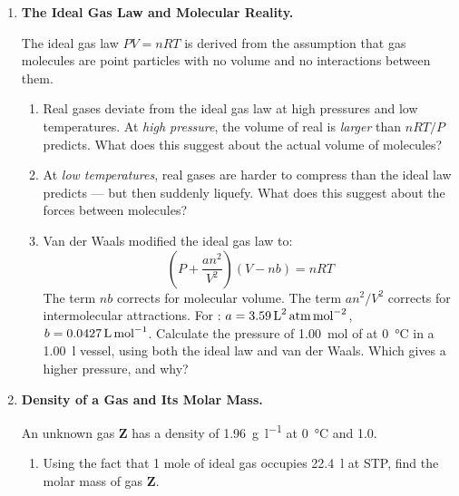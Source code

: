 \documentclass[12pt, a4paper]{book}
\theoremstyle{definition}
\begin{document}
\begin{deepbox}
\begin{enumerate}[label=\textbf{D\arabic*.}]
  \item \textbf{The Ideal Gas Law and Molecular Reality.}

        The ideal gas law $PV = nRT$ is derived from the assumption
        that gas molecules are point particles with no volume
        and no interactions between them.

        \begin{enumerate}[label=(\alph*)]
          \item Real gases deviate from the ideal gas law at
                high pressures and low temperatures.
                At \emph{high pressure}, the volume of real 
                is \emph{larger} than $nRT/P$ predicts.
                What does this suggest about the actual volume
                of  molecules?

          \item At \emph{low temperatures}, real gases are harder
                to compress than the ideal law predicts ---
                but then suddenly liquefy.
                What does this suggest about the forces between molecules?

          \item Van der Waals modified the ideal gas law to:
                \[
                  \left(P + \frac{an^2}{V^2}\right)(V - nb) = nRT
                \]
                The term $nb$ corrects for molecular volume.
                The term $an^2/V^2$ corrects for intermolecular
                attractions.
                For : $a = 3.59\,\text{L}^2\,\text{atm\,mol}^{-2}$,
                $b = 0.0427\,\text{L\,mol}^{-1}$.
                Calculate the pressure of \SI{1.00}{\mol} of 
                at \SI{0}{\degreeCelsius} in a \SI{1.00}{\litre} vessel,
                using both the ideal law and van der Waals.
                Which gives a higher pressure, and why?
        \end{enumerate}

  \item \textbf{Density of a Gas and Its Molar Mass.}

        An unknown gas \textbf{Z} has a density of
        \SI{1.96}{\gram\per\litre} at \SI{0}{\degreeCelsius}
        and \SI{1.0}{}.

        \begin{enumerate}[label=(\alph*)]
          \item Using the fact that 1 mole of ideal gas
                occupies \SI{22.4}{\litre} at STP,
                find the molar mass of gas \textbf{Z}.


\end{enumerate}
\end{enumerate}
\end{deepbox}
\end{document}
